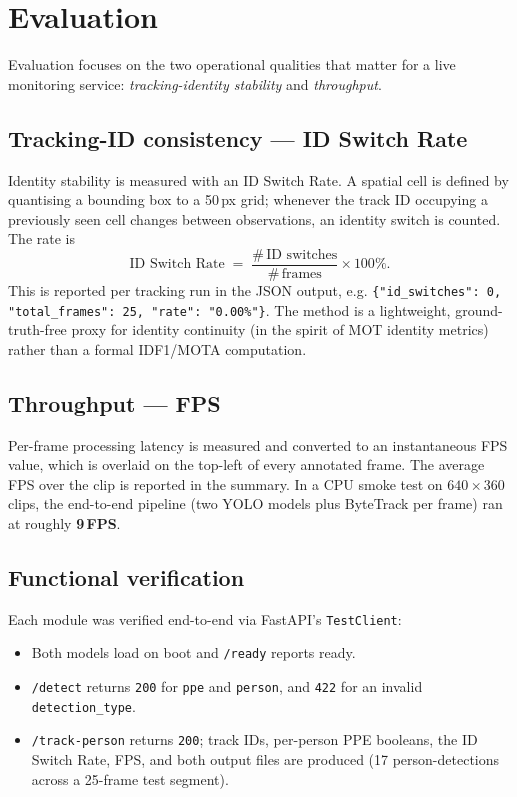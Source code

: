 \documentclass[11pt,a4paper]{article}
\begin{document}
\section{Evaluation}

Evaluation focuses on the two operational qualities that matter for a live
monitoring service: \emph{tracking-identity stability} and \emph{throughput}.

\subsection{Tracking-ID consistency --- ID Switch Rate}
Identity stability is measured with an ID Switch Rate. A spatial cell is
defined by quantising a bounding box to a 50\,px grid; whenever the track ID
occupying a previously seen cell changes between observations, an identity
switch is counted. The rate is
\[
\text{ID Switch Rate} \;=\; \frac{\#\,\text{ID switches}}{\#\,\text{frames}} \times 100\%.
\]
This is reported per tracking run in the JSON output, e.g.
\verb|{"id_switches": 0, "total_frames": 25, "rate": "0.00%"}|. The method is a
lightweight, ground-truth-free proxy for identity continuity (in the spirit of
MOT identity metrics) rather than a formal IDF1/MOTA computation.

\subsection{Throughput --- FPS}
Per-frame processing latency is measured and converted to an instantaneous FPS
value, which is overlaid on the top-left of every annotated frame. The average
FPS over the clip is reported in the summary. In a CPU smoke test on
$640\times360$ clips, the end-to-end pipeline (two YOLO models plus ByteTrack
per frame) ran at roughly \textbf{9\,FPS}.

\subsection{Functional verification}
Each module was verified end-to-end via FastAPI's \verb|TestClient|:
\begin{itemize}
  \item Both models load on boot and \verb|/ready| reports ready.
  \item \verb|/detect| returns \verb|200| for \verb|ppe| and \verb|person|, and
        \verb|422| for an invalid \verb|detection_type|.
  \item \verb|/track-person| returns \verb|200|; track IDs, per-person PPE
        booleans, the ID Switch Rate, FPS, and both output files are produced
        (17 person-detections across a 25-frame test segment).
\end{itemize}
\end{document}

